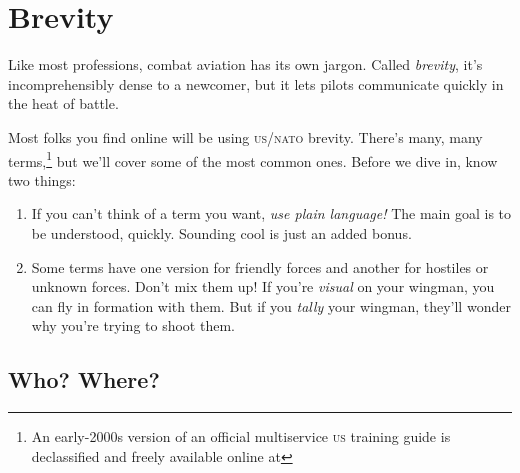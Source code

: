 \chapter{Brevity}

Like most professions, combat aviation has its own jargon.
Called \emph{brevity}, it's incomprehensibly dense to a newcomer,
but it lets pilots communicate quickly in the heat of battle.

Most folks you find online will be using \textsc{us/nato} brevity.
There's many,
many terms,\punckern\footnote{An early-2000s version of an official
multiservice \textsc{us} training guide is declassified and freely available
online at }
but we'll cover some of the most common ones.
Before we dive in, know two things:
\begin{enumerate}
\item If you can't think of a term you want,
    \emph{use plain language!}
    The main goal is to be understood, quickly.
    Sounding cool is just an added bonus.
\item Some terms have one version for friendly forces
    and another for hostiles or unknown forces.
    Don't mix them up!
    If you're \emph{visual} on your wingman,
    you can fly in formation with them.
    But if you \emph{tally} your wingman,
    they'll wonder why you're trying to shoot them.
\end{enumerate}

\section{Who? Where?}

